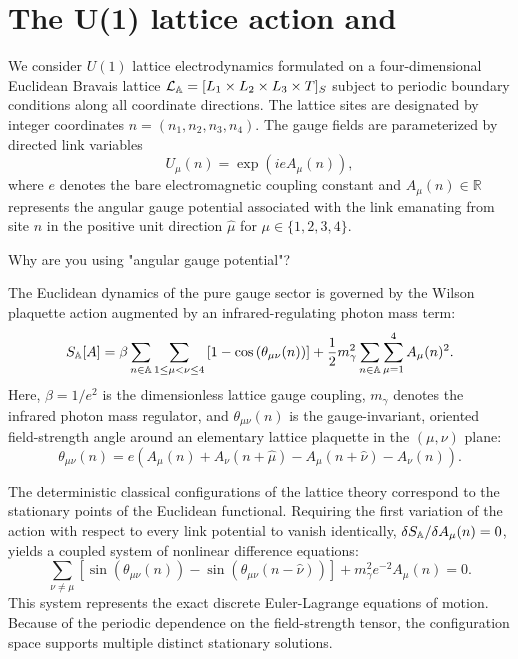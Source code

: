\documentclass[11pt,a4paper]{article}
\begin{document}
\section{The  U(1) lattice action and \ELe}

We consider  $U(1)$ lattice electrodynamics formulated on a four-dimensional Euclidean Bravais lattice $\mathcal{L}_{\mathbb{A}} = [L_1 \times L_2 \times L_3 \times T]_S$ subject to periodic boundary conditions along all coordinate directions. The lattice sites are designated by integer coordinates $n = (n_1, n_2, n_3, n_4)$. The gauge fields are parameterized by directed link variables
\begin{equation}
U_\mu(n) = \exp\left(i e A_\mu(n)\right),
\end{equation}
where $e$ denotes the bare electromagnetic coupling constant and $A_\mu(n) \in \mathbb{R}$ represents the angular gauge potential associated with the link emanating from site $n$ in the positive unit direction $\hat{\mu}$ for $\mu \in \{1,2,3,4\}$.

{Why are you using "angular gauge potential"?}

The Euclidean dynamics of the pure gauge sector is governed by the Wilson plaquette action augmented by an infrared-regulating photon mass term:
\begin{equation}
S_{\mathbb{A}}[A] = \beta \sum_{n \in \mathbb{A}} \sum_{1 \le \mu < \nu \le 4} \left[ 1 - \cos\left(\theta_{\mu\nu}(n)\right) \right] + \frac{1}{2} m_\gamma^2 \sum_{n \in \mathbb{A}} \sum_{\mu=1}^4 A_\mu(n)^2.
\end{equation}
Here, $\beta = 1/e^2$ is the dimensionless lattice gauge coupling, $m_\gamma$ denotes the infrared photon mass regulator, and $\theta_{\mu\nu}(n)$ is the gauge-invariant, oriented field-strength angle around an elementary lattice plaquette in the $(\mu,\nu)$ plane:
\begin{equation}
\theta_{\mu\nu}(n) = e \left( A_\mu(n) + A_\nu(n+\hat{\mu}) - A_\mu(n+\hat{\nu}) - A_\nu(n) \right).
\end{equation}

The deterministic classical configurations of the lattice theory correspond to the stationary points of the Euclidean functional. Requiring the first variation of the action with respect to every link potential to vanish identically, $\delta S_{\mathbb{A}} / \delta A_\mu(n) = 0$, yields a coupled system of nonlinear difference equations:
\begin{equation}
\sum_{\nu \neq \mu} \left[ \sin\left(\theta_{\mu\nu}(n)\right) - \sin\left(\theta_{\mu\nu}(n-\hat{\nu})\right) \right] + m_\gamma^2 e^{-2} A_\mu(n) = 0.
\end{equation}
This system represents the exact discrete Euler-Lagrange equations of motion. Because of the periodic dependence on the field-strength tensor, the configuration space supports multiple distinct stationary solutions.
\end{document}
